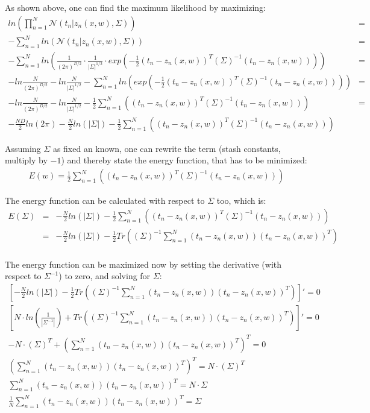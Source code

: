 \documentclass{article}
\begin{document}
As shown above, one can find the maximum likelihood by maximizing:
\begin{eqnarray}
ln \left( \prod_{n=1}^N\mathcal{N}(t_n | z_n(x,w), \Sigma) \right) &=& \\
- \sum_{n=1}^N  ln \left( \mathcal{N}(t_n | z_n(x,w), \Sigma) \right) &=& \\
- \sum_{n=1}^N  ln \left( \frac{1}{(2\pi)^{D/2}}\cdot \frac{1}{|\Sigma |^{1/2}}\cdot exp \left( -\frac{1}{2} (t_n-z_n(x,w))^T(\Sigma)^{-1}(t_n-z_n(x,w))\right) \right) &=& \\
- ln \frac{N}{(2\pi)^{D/2}} - ln \frac{N}{|\Sigma |^{1/2}} -\sum_{n=1}^N  ln \left( exp \left( -\frac{1}{2} (t_n-z_n(x,w))^T(\Sigma)^{-1}(t_n-z_n(x,w))\right) \right) &=& \\
- ln \frac{N}{(2\pi)^{D/2}} - ln \frac{N}{|\Sigma |^{1/2}} -\frac{1}{2} \sum_{n=1}^N \left((t_n-z_n(x,w))^T(\Sigma)^{-1}(t_n-z_n(x,w))\right) &=& \\
- \frac{ND}{2}ln(2\pi) - \frac{N}{2} ln (|\Sigma|) -\frac{1}{2} \sum_{n=1}^N \left((t_n-z_n(x,w))^T(\Sigma)^{-1}(t_n-z_n(x,w))\right)
\end{eqnarray}

Assuming $\Sigma$ as fixed an known, one can rewrite the term (stash constants, multiply by $-1$) and thereby state the energy function, that has to be minimized:
\begin{eqnarray}
E(w) = \frac{1}{2} \sum_{n=1}^N \left((t_n-z_n(x,w))^T(\Sigma)^{-1}(t_n-z_n(x,w))\right)
\end{eqnarray}

The energy function can be calculated with respect to $\Sigma$ too, which is:
\begin{eqnarray}
E(\Sigma) &=& -\frac{N}{2} ln (|\Sigma|) -\frac{1}{2} \sum_{n=1}^N \left((t_n-z_n(x,w))^T(\Sigma)^{-1}(t_n-z_n(x,w))\right)\\
&=& -\frac{N}{2} ln (|\Sigma|) - \frac{1}{2} Tr\left( (\Sigma)^{-1} \sum_{n=1}^N (t_n-z_n(x,w))(t_n-z_n(x,w))^T\right)\\
\end{eqnarray}

The energy function can be maximized now by setting the derivative (with respect to $\Sigma^{-1}$) to zero, and solving for $\Sigma$:
\begin{eqnarray}
\left[ -\frac{N}{2} ln (|\Sigma|) - \frac{1}{2} Tr\left( (\Sigma)^{-1} \sum_{n=1}^N (t_n-z_n(x,w))(t_n-z_n(x,w))^T\right) \right]' = 0\\
\left[ N \cdot ln (\frac{1}{|\Sigma^{-1}|}) + Tr\left( (\Sigma)^{-1} \sum_{n=1}^N (t_n-z_n(x,w))(t_n-z_n(x,w))^T\right) \right]' = 0\\
-N \cdot (\Sigma)^{T} + \left(\sum_{n=1}^N (t_n-z_n(x,w))(t_n-z_n(x,w))^T \right)^T = 0\\
\left(\sum_{n=1}^N (t_n-z_n(x,w))(t_n-z_n(x,w))^T \right)^T = N \cdot (\Sigma)^{T}\\
\sum_{n=1}^N (t_n-z_n(x,w))(t_n-z_n(x,w))^T = N \cdot \Sigma\\
\frac{1}{N}\sum_{n=1}^{N} (t_n-z_n(x,w))(t_n-z_n(x,w))^T = \Sigma
\end{eqnarray}
\end{document}

